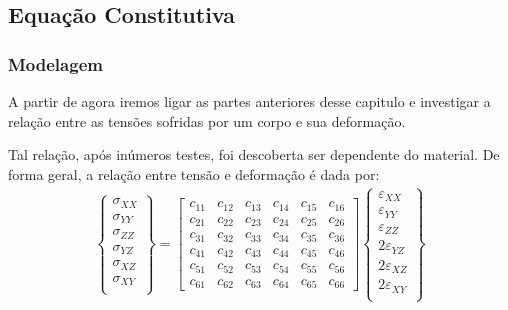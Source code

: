 \documentclass{article}
\begin{document}
\subsection{Equação Constitutiva}

\subsubsection{Modelagem}
A partir de agora iremos ligar as partes anteriores desse capitulo e investigar a relação entre as tensões sofridas por um corpo e sua deformação.

Tal relação, após inúmeros testes, foi descoberta ser dependente do material. De forma geral, a relação entre tensão e deformação é dada por:
\begin{align*}
    \begin{Bmatrix}
        \sigma_{XX} \\
        \sigma_{YY} \\
        \sigma_{ZZ} \\
        \sigma_{YZ} \\
        \sigma_{XZ} \\
        \sigma_{XY} \\
    \end{Bmatrix} =
    \begin{bmatrix}
        c_{11} & c_{12} & c_{13} & c_{14} & c_{15} & c_{16} \\
        c_{21} & c_{22} & c_{23} & c_{24} & c_{25} & c_{26} \\
        c_{31} & c_{32} & c_{33} & c_{34} & c_{35} & c_{36} \\
        c_{41} & c_{42} & c_{43} & c_{44} & c_{45} & c_{46} \\
        c_{51} & c_{52} & c_{53} & c_{54} & c_{55} & c_{56} \\
        c_{61} & c_{62} & c_{63} & c_{64} & c_{65} & c_{66}
    \end{bmatrix}
    \begin{Bmatrix}
        \varepsilon_{XX}  \\
        \varepsilon_{YY}  \\
        \varepsilon_{ZZ}  \\
        2\varepsilon_{YZ} \\
        2\varepsilon_{XZ} \\
        2\varepsilon_{XY} \\
    \end{Bmatrix}
\end{align*}
\end{document}
